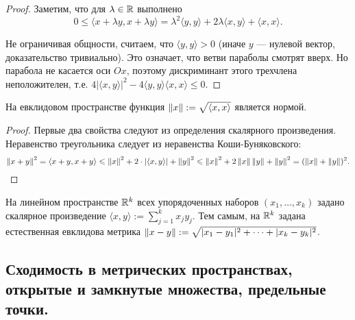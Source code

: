 \documentclass[a4paper]{article}
\theoremstyle{named}
\begin{document}
    \begin{proof}
        Заметим, что для $\lambda \in \mathbb{R}$ выполнено
        \begin{equation*}
            0 \leq \langle x + \lambda y, x + \lambda y \rangle = \lambda^2 \langle y, y \rangle + 2\lambda \langle x, y \rangle + \langle x, x \rangle.
        \end{equation*}

        Не ограничивая общности, считаем, что $\langle y, y \rangle > 0$ (иначе $y$ --- нулевой вектор, доказательство тривиально). Это означает, что ветви параболы смотрят вверх. Но парабола не касается оси $Ox$, поэтому дискриминант этого трехчлена неположителен, т.е. $4|\langle x, y \rangle|^2 - 4\langle y, y \rangle \langle x, x \rangle \leq 0$.
    \end{proof}

    \begin{consequence*}
        На евклидовом пространстве функция $\left\lVert x\right\rVert := \sqrt{\langle x, x \rangle}$ является нормой.
    \end{consequence*}

    \begin{proof}
        Первые два свойства следуют из определения скалярного произведения. Неравенство треугольника следует из неравенства Коши-Буняковского:
        \begin{equation*}
            \left\lVert x + y\right\rVert^2 = \langle x + y, x + y \rangle \leqslant \left\lVert x\right\rVert^2 + 2 \cdot |\langle x, y \rangle| + \left\lVert y\right\rVert^2 \leqslant \left\lVert x\right\rVert^2 + 2\left\lVert x\right\rVert\left\lVert y\right\rVert + \left\lVert y\right\rVert^2 = (\left\lVert x\right\rVert + \left\lVert y\right\rVert)^2.
        \end{equation*}
    \end{proof}

    \begin{example*}
        На линейном пространстве $\mathbb{R}^k$ всех упорядоченных наборов $(x_1, \dots, x_k)$ задано скалярное произведение $\langle x, y \rangle := \sum_{j = 1}^k x_jy_j$. Тем самым, на $\mathbb{R}^k$ задана естественная евклидова метрика $\left\lVert x - y\right\rVert := \sqrt{|x_1 - y_1|^2 + \dots + |x_k - y_k|^2}$.
    \end{example*}

    \subsection{Сходимость в метрических пространствах, открытые и замкнутые множества, предельные точки.}
\end{document}
